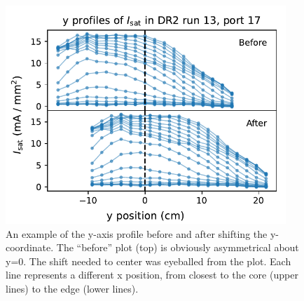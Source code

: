 \begin{figure}
	\centering
	\includegraphics[width=300pt]{figures/y-alignment_before-after.pdf}
	\caption[y-axis profile before and after shifting the y-coordinate]{\label{fig:y-alignment_before-after}An example of the y-axis profile before and after shifting the y-coordinate. The ``before'' plot (top) is obviously asymmetrical about y=0. The shift needed to center was eyeballed from the plot. Each line represents a different x position, from closest to the core (upper lines) to the edge (lower lines).}
\end{figure}

